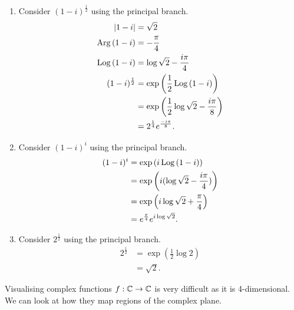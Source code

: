 \begin{example}
    \begin{enumerate}
        \item Consider $(1 - i)^{\frac12}$ using the principal branch.
            \begin{align*}
                \lvert 1 - i \rvert &= \sqrt 2 \\
                \operatorname{Arg}{(1 - i)} &= -\frac{\pi}4 \\
                \operatorname{Log}{(1 - i)} &= \log{\sqrt 2} - \frac{i\pi}{4} \\
                (1-i)^{\frac12} &= \exp{\left(\frac12\operatorname{Log}{(1 - i)}\right)} \\
                &= \exp{\left(\frac12\log{\sqrt 2} - \frac{i\pi}{8}\right)} \\
                &= 2^{\frac14} e^{\frac{-i\pi}{8}}.
            \end{align*}

        \item Consider $(1 - i)^i$ using the principal branch.
            \begin{align*}
                (1 - i)^i &= \exp{\left(i\operatorname{Log}{(1 - i)}\right)} \\
                    &= \exp{\left(i(\log{\sqrt 2} - \frac{i\pi}4)\right)} \\
                    &= \exp{\left(i\log{\sqrt 2} + \frac{\pi}4\right)} \\
                    &= e^{\frac{\pi}{4}}e^{i\log{\sqrt 2}}.
            \end{align*}

        \item Consider $2^\frac12$ using the principal branch.
            \begin{align*}
                2^\frac12 &= \exp{\left(\frac12\log{2}\right)} \\
                &= \sqrt 2.
            \end{align*}
    \end{enumerate}
\end{example}

\begin{remark}
    Visualising complex functions $f: \mathbb{C} \to \mathbb{C}$ is very difficult as it is 4-dimensional. We can look at how they map regions of the complex plane.
\end{remark}
